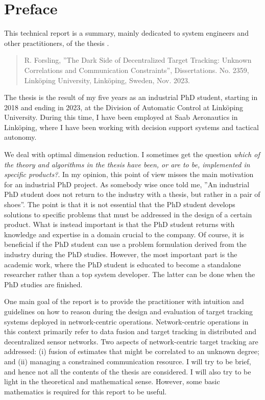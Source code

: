 
\newpage
\section*{Preface}

This technical report is a summary, mainly dedicated to system engineers and other practitioners, of the thesis \cite{Forsling2023Phd}. 
\begin{quotation}
	\noindent
	R. Forsling, ''The Dark Side of Decentralized Target Tracking: Unknown Correlations and Communication Constraints'', Dissertations. No. 2359, Linköping University, Linköping, Sweden, Nov. 2023.
\end{quotation}
The thesis \cite{Forsling2023Phd} is the result of my five years as an industrial PhD student, starting in 2018 and ending in 2023, at the Division of Automatic Control at Linköping University. During this time, I have been employed at Saab Aeronautics in Linköping, where I have been working with decision support systems and tactical autonomy.

We deal with optimal dimension reduction. I sometimes get the question \emph{which of the theory and algorithms in the thesis have been, or are to be, implemented in specific products?}. In my opinion, this point of view misses the main motivation for an industrial PhD project. As somebody wise once told me, ''An industrial PhD student does not return to the industry with a thesis, but rather in a pair of shoes''. The point is that it is not essential that the PhD student develops solutions to specific problems that must be addressed in the design of a certain product. What is instead important is that the PhD student returns with knowledge and expertise in a domain crucial to the company. Of course, it is beneficial if the PhD student can use a problem formulation derived from the industry during the PhD studies. However, the most important part is the academic work, where the PhD student is educated to become a standalone researcher rather than a top system developer. The latter can be done when the PhD studies are finished.

One main goal of the report is to provide the practitioner with intuition and guidelines on how to reason during the design and evaluation of target tracking systems deployed in network-centric operations. Network-centric operations in this context primarily refer to data fusion and target tracking in distributed and decentralized sensor networks. Two aspects of network-centric target tracking are addressed: (i) fusion of estimates that might be correlated to an unknown degree; and (ii) managing a constrained communication resource. I will try to be brief, and hence not all the contents of the thesis are considered. I will also try to be light in the theoretical and mathematical sense. However, some basic mathematics is required for this report to be useful.